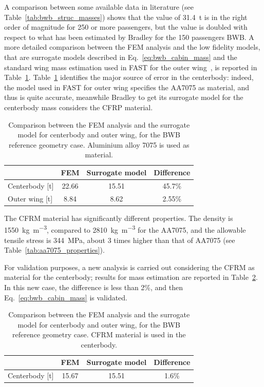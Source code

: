 A comparison between some available data in literature (see Table~\ref{tab:bwb_struc_masses}) shows that the value of 31.4~\si{\tonne} is in the right order of magnitude for 250 or more passengers, but the value is doubled with respect to what has been estimated by Bradley for the 150 passengers BWB.
A more detailed comparison between the FEM analysis and the low fidelity models, that are surrogate models described in Eq.~\eqref{eq:bwb_cabin_mass} and the standard wing mass estimation used in FAST for the outer wing~\cite{bib:airbus_notes}, is reported in Table~\ref{tab:bwb_structure_method_comparison}.
Table~\ref{tab:bwb_structure_method_comparison} identifies the major source of error in the centerbody: indeed, the model used in FAST for outer wing specifies the AA7075 as material, and thus is quite accurate, meanwhile Bradley to get its surrogate model for the centerbody mass considers the CFRP material. 
\begin{table}[!h]
	\centering
	\begin{tabular}{l c c c}
		\hline
		& \textbf{FEM} & \textbf{Surrogate model} & \textbf{Difference} \\
		\hline
		Centerbody [\si{\tonne}] & 22.66 & 15.51 &  45.7\% \\
		Outer wing [\si{\tonne}] & 8.84 & 8.62 & 2.55\% \\
		\hline
	\end{tabular}
	\caption{Comparison between the FEM analysis and the surrogate model for centerbody and outer wing, for the BWB reference geometry case. Aluminium alloy 7075 is used as material.}
	\label{tab:bwb_structure_method_comparison}
\end{table}

The CFRM material has significantly different properties.
The density is 1550~\si{\kilogram\per\cubic\meter}, compared to 2810~\si{\kilogram\per\cubic\meter} for the AA7075, and the allowable tensile stress is 344~\si{\mega\pascal}, about 3 times higher than that of AA7075 (see Table~\ref{tab:aa7075_properties}). 

For validation purposes, a new analysis is carried out considering the CFRM as material for the centerbody; results for mass estimation are reported in Table~\ref{tab:bwb_bradley_model_validation}.
In this new case, the difference is less than 2\%, and then Eq.~\eqref{eq:bwb_cabin_mass} is validated.
\begin{table}[!h]
	\centering
	\begin{tabular}{l c c c}
		\hline
		& \textbf{FEM} & \textbf{Surrogate model} & \textbf{Difference} \\
		\hline
		Centerbody [\si{\tonne}] & 15.67 & 15.51 &  1.6\% \\
		\hline
	\end{tabular}
	\caption{Comparison between the FEM analysis and the surrogate model for centerbody and outer wing, for the BWB reference geometry case. CFRM material is used in the centerbody.}
	\label{tab:bwb_bradley_model_validation}
\end{table}

